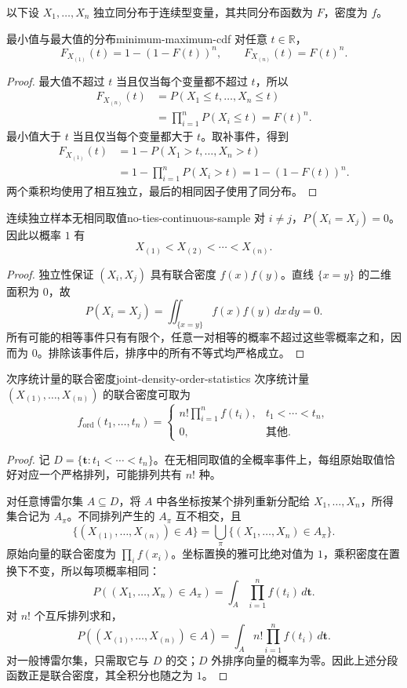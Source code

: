 以下设 $X_1,\ldots,X_n$ 独立同分布于连续型变量，其共同分布函数为 $F$，密度为 $f$。

\begin{proposition}{最小值与最大值的分布}{minimum-maximum-cdf}
对任意 $t\in\mathbb R$，
\[
F_{X_{(1)}}(t)=1-(1-F(t))^n,\qquad
F_{X_{(n)}}(t)=F(t)^n.
\]
\end{proposition}
\begin{proof}
最大值不超过 $t$ 当且仅当每个变量都不超过 $t$，所以
\begin{align*}
F_{X_{(n)}}(t)
&=P(X_1\leq t,\ldots,X_n\leq t)\\
&=\prod_{i=1}^nP(X_i\leq t)=F(t)^n.
\end{align*}
最小值大于 $t$ 当且仅当每个变量都大于 $t$。取补事件，得到
\begin{align*}
F_{X_{(1)}}(t)
&=1-P(X_1>t,\ldots,X_n>t)\\
&=1-\prod_{i=1}^nP(X_i>t)
=1-(1-F(t))^n.
\end{align*}
两个乘积均使用了相互独立，最后的相同因子使用了同分布。
\end{proof}

\begin{proposition}{连续独立样本无相同取值}{no-ties-continuous-sample}
对 $i\ne j$，$P(X_i=X_j)=0$。因此以概率 $1$ 有
\[
X_{(1)}<X_{(2)}<\cdots<X_{(n)}.
\]
\end{proposition}
\begin{proof}
独立性保证 $(X_i,X_j)$ 具有联合密度 $f(x)f(y)$。直线 $\{x=y\}$ 的二维面积为 $0$，故
\[
P(X_i=X_j)=\iint_{\{x=y\}}f(x)f(y)\,dx\,dy=0.
\]
所有可能的相等事件只有有限个，任意一对相等的概率不超过这些零概率之和，因而为 $0$。排除该事件后，排序中的所有不等式均严格成立。
\end{proof}

\begin{mytheorem}{次序统计量的联合密度}{joint-density-order-statistics}
次序统计量 $(X_{(1)},\ldots,X_{(n)})$ 的联合密度可取为
\[
f_{\mathrm{ord}}(t_1,\ldots,t_n)=
\begin{cases}
\displaystyle n!\prod_{i=1}^nf(t_i),&t_1<\cdots<t_n,\\
0,&\text{其他}.
\end{cases}
\]
\end{mytheorem}
\begin{proof}
记 $D=\{\boldsymbol t:t_1<\cdots<t_n\}$。在无相同取值的全概率事件上，每组原始取值恰好对应一个严格排列，可能排列共有 $n!$ 种。

对任意博雷尔集 $A\subseteq D$，将 $A$ 中各坐标按某个排列重新分配给 $X_1,\ldots,X_n$，所得集合记为 $A_\pi$。不同排列产生的 $A_\pi$ 互不相交，且
\[
\{(X_{(1)},\ldots,X_{(n)})\in A\}
=\bigcup_\pi\{(X_1,\ldots,X_n)\in A_\pi\}.
\]
原始向量的联合密度为 $\prod_i f(x_i)$。坐标置换的雅可比绝对值为 $1$，乘积密度在置换下不变，所以每项概率相同：
\[
P((X_1,\ldots,X_n)\in A_\pi)=\int_A\prod_{i=1}^nf(t_i)\,d\boldsymbol t.
\]
对 $n!$ 个互斥排列求和，
\[
P((X_{(1)},\ldots,X_{(n)})\in A)
=\int_A n!\prod_{i=1}^nf(t_i)\,d\boldsymbol t.
\]
对一般博雷尔集，只需取它与 $D$ 的交；$D$ 外排序向量的概率为零。因此上述分段函数正是联合密度，其全积分也随之为 $1$。
\end{proof}

